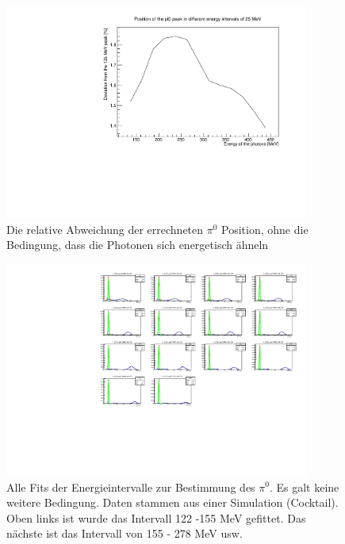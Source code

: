 \documentclass[a4paper,11pt,oneside,final,german,openbib,pdftex]{scrbook}
\begin{document}
\begin{appendix}
\begin{figure}
	\begin{center}
		\includegraphics[width=100mm]{RealDataEnergyIntervalAllPhotonsRelativeDeviation}
		\caption{Die relative Abweichung der errechneten $\pi^0$ Position, ohne die Bedingung, dass die Photonen sich energetisch ähneln}
		\label{fig:Relative-Deviation-Energy-Interval-No-Condition}
	\end{center}
\end{figure}

\begin{figure}
	\begin{center}
		\includegraphics[width=100mm]{NoEdgeAngleAllFits1403}
		\caption{Alle Fits der Energieintervalle zur Bestimmung des $\pi^0$. Es galt keine weitere Bedingung. Daten stammen aus einer Simulation (Cocktail). Oben links ist wurde das Intervall 122 -155 MeV gefittet. Das nächste ist das Intervall von 155 - 278 MeV usw.}
	\end{center}
\end{figure}


\end{appendix}
\end{document}
